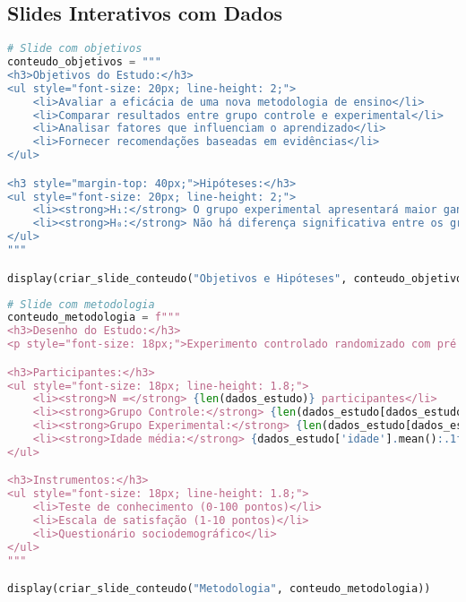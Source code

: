 \subsection{Slides Interativos com Dados}

\begin{pythonbox}
\begin{lstlisting}[language=Python]
# Slide com objetivos
conteudo_objetivos = """
<h3>Objetivos do Estudo:</h3>
<ul style="font-size: 20px; line-height: 2;">
    <li>Avaliar a eficácia de uma nova metodologia de ensino</li>
    <li>Comparar resultados entre grupo controle e experimental</li>
    <li>Analisar fatores que influenciam o aprendizado</li>
    <li>Fornecer recomendações baseadas em evidências</li>
</ul>

<h3 style="margin-top: 40px;">Hipóteses:</h3>
<ul style="font-size: 20px; line-height: 2;">
    <li><strong>H₁:</strong> O grupo experimental apresentará maior ganho de aprendizado</li>
    <li><strong>H₀:</strong> Não há diferença significativa entre os grupos</li>
</ul>
"""

display(criar_slide_conteudo("Objetivos e Hipóteses", conteudo_objetivos))
\end{lstlisting}
\end{pythonbox}

\begin{pythonbox}
\begin{lstlisting}[language=Python]
# Slide com metodologia
conteudo_metodologia = f"""
<h3>Desenho do Estudo:</h3>
<p style="font-size: 18px;">Experimento controlado randomizado com pré e pós-teste</p>

<h3>Participantes:</h3>
<ul style="font-size: 18px; line-height: 1.8;">
    <li><strong>N =</strong> {len(dados_estudo)} participantes</li>
    <li><strong>Grupo Controle:</strong> {len(dados_estudo[dados_estudo['grupo'] == 'Controle'])} participantes</li>
    <li><strong>Grupo Experimental:</strong> {len(dados_estudo[dados_estudo['grupo'] == 'Experimental'])} participantes</li>
    <li><strong>Idade média:</strong> {dados_estudo['idade'].mean():.1f} anos (DP = {dados_estudo['idade'].std():.1f})</li>
</ul>

<h3>Instrumentos:</h3>
<ul style="font-size: 18px; line-height: 1.8;">
    <li>Teste de conhecimento (0-100 pontos)</li>
    <li>Escala de satisfação (1-10 pontos)</li>
    <li>Questionário sociodemográfico</li>
</ul>
"""

display(criar_slide_conteudo("Metodologia", conteudo_metodologia))
\end{lstlisting}
\end{pythonbox}

